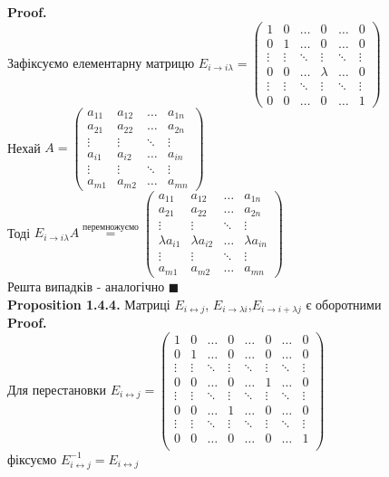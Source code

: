 \documentclass[a4paper, 10pt]{article}
\def\prp#1{\textbf{Proposition {#1}}}
\def\proof{\textbf{Proof.}\\}
\def\qed{$\blacksquare$}
\theoremstyle{theoremdd}
\theoremstyle{theoremdd}
\theoremstyle{theoremdd}
\theoremstyle{theoremdd}
\theoremstyle{theoremdd}
\theoremstyle{theoremdd}
\theoremstyle{theoremdd}
\theoremstyle{theoremdd}
\begin{document}
	\proof
	Зафіксуємо елементарну матрицю $E_{i \rightarrow i \lambda} = \begin{pmatrix}
	1 & 0 & \dots & 0 & \dots & 0 \\
	0 & 1 & \dots & 0 & \dots & 0 \\
	\vdots & \vdots & \ddots & \vdots & \ddots & \vdots \\
	0 & 0 & \dots & \lambda & \dots & 0 \\
	\vdots & \vdots & \ddots & \vdots & \ddots & \vdots \\
	0 & 0 & \dots & 0 & \dots & 1
\end{pmatrix}$\\
	Нехай $A = \begin{pmatrix}
	a_{11} & a_{12} & \dots & a_{1n} \\
	a_{21} & a_{22} & \dots & a_{2n} \\
	\vdots & \vdots & \ddots & \vdots \\
	a_{i1} & a_{i2} & \dots & a_{in} \\
	\vdots & \vdots & \ddots & \vdots \\
	a_{m1} & a_{m2} & \dots & a_{mn}
	\end{pmatrix}$ \\
	Тоді $E_{i \rightarrow i\lambda} A \overset{\textrm{перемножуємо}}{=} \begin{pmatrix}
	a_{11} & a_{12} & \dots & a_{1n} \\
	a_{21} & a_{22} & \dots & a_{2n} \\
	\vdots & \vdots & \ddots & \vdots \\
	\lambda a_{i1} & \lambda a_{i2} & \dots & \lambda a_{in} \\
	\vdots & \vdots & \ddots & \vdots \\
	a_{m1} & a_{m2} & \dots & a_{mn}
	\end{pmatrix}$\\
	Решта випадків - аналогічно \qed
	\bigskip \\
	\prp{1.4.4.} Матриці $E_{i \leftrightarrow j}$, $E_{i \rightarrow \lambda i}$,$E_{i \rightarrow i + \lambda j}$ є оборотними\\
	\proof
	Для перестановки $E_{i \leftrightarrow j} = \begin{pmatrix}
	1 & 0 & \dots & 0 & \dots & 0 & \dots & 0 \\
	0 & 1 & \dots & 0 & \dots & 0 & \dots & 0 \\
	\vdots & \vdots &\ddots & \vdots & \ddots & \vdots & \ddots & \vdots \\
	0 & 0 & \dots & 0 & \dots & 1 & \dots & 0 \\
	\vdots & \vdots &\ddots & \vdots & \ddots & \vdots & \ddots & \vdots \\
	0 & 0 & \dots & 1 & \dots & 0 & \dots & 0 \\
	\vdots & \vdots &\ddots & \vdots & \ddots & \vdots & \ddots & \vdots \\
	0 & 0 & \dots & 0 & \dots & 0 & \dots & 1 \\
	\end{pmatrix}$ \\ фіксуємо $E_{i \leftrightarrow j}^{-1} = E_{i \leftrightarrow j}$\\
\end{document}
